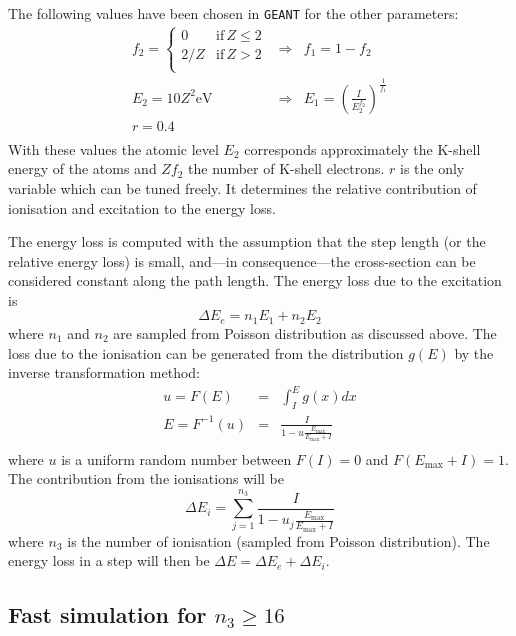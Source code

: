 \documentclass{article}
\newcommand{\Emax}{\ensuremath{E_{\mathrm{max}}}}
\newcommand{\GEANT}{\texttt{GEANT}}
\begin{document}
The following values have been chosen in \GEANT{} for the other
parameters:
\[ 
\begin{array}{lcl}
f_2 = \left\{ \begin{array}{ll}
             0   & \mathrm{if}\, Z \leq 2 \\
             2/Z & \mathrm{if}\, Z > 2 \\
             \end{array} \right.    & \Rightarrow & f_1 = 1 - f_2 \\
E_2 = 10 Z^2 \mathrm{eV}  & \Rightarrow & E_1 = \left(\frac{I}{E_{2}^{f_2}}
                                              \right)^{\frac{1}{f_1}} \\
r  = 0.4 & & \\
\end{array}
\]
With these values the atomic level $E_2$ corresponds approximately
the K-shell energy of the atoms and $Zf_2$ the number of K-shell
electrons. $r$ is the only variable which can be tuned freely. It
determines the relative contribution of ionisation and
excitation to the energy loss.

The energy loss is computed with the assumption that the step length
(or the relative energy loss) is small, and---in consequence---the
cross-section can be considered constant along the path length.  The
energy loss due to the excitation is
\begin{equation}
\Delta E_e = n_1 E_1 + n_2 E_2
\end{equation}
where $n_1$ and $n_2$ are sampled from Poisson distribution as
discussed above.  The loss due to the ionisation can be generated from
the distribution $g(E)$ by the inverse transformation method:
\begin{eqnarray}
u = F(E) &  = & \int_{I}^E g(x) dx \nonumber \\
E = F^{-1}(u) & = & \frac{I}{1 - u \frac {\Emax}{\Emax+I}} \\
\end{eqnarray}
where $u$ is a uniform random number between $F(I)=0$ and
$F(\Emax+I)=1$.  The contribution from the ionisations will be
\begin{equation}
\Delta E_i  = \sum_{j=1}^{n_3} \frac{I}
              {1 - u_j \frac {\Emax}{\Emax + I}}
\end{equation}
where $n_3$ is the number of ionisation (sampled from Poisson
distribution). The energy loss in a step will then be $\Delta E =
\Delta E_e + \Delta E_i$.

\subsection{Fast simulation for $n_3 \geq 16$}
\end{document}
